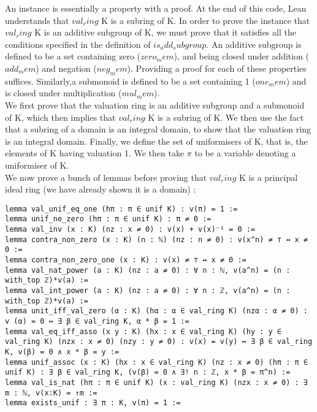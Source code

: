 \documentclass[10pt, a4paper]{article}
\begin{document}
An instance is essentially a property with a proof. At the end of this code, Lean understands that $val_ring$ K is a subring of K. In order to prove the instance that $val_ring$ K is an additive subgroup of K, we must prove that it satisfies all the conditions specified in the definition of $is_add_subgroup$. An additive subgroup is defined to be a set containing zero ($zero_mem$), and being closed under addition ($add_mem$) and negation ($neg_mem$). Providing a proof for each of these properties suffices. Similarly,a submonoid is defined to be a set containing 1 ($one_mem$) and is closed under multiplication ($mul_mem$). \\

We first prove that the valuation ring is an additive subgroup and a submonoid of K, which then implies that $val_ring$ K is a subring of K. We then use the fact that a subring of a domain is an integral domain, to show that the valuation ring is an integral domain. Finally, we define the set of uniformisers of K, that is, the elements of K having valuation 1. We then take $\pi$ to be a variable denoting a uniformiser of K. \\ 

We now prove a bunch of lemmas before proving that $val_ring$ K is a principal ideal ring (we have already shown it is a domain) :

\begin{lstlisting}
lemma val_unif_eq_one (hπ : π ∈ unif K) : v(π) = 1 :=
lemma unif_ne_zero (hπ : π ∈ unif K) : π ≠ 0 :=
lemma val_inv (x : K) (nz : x ≠ 0) : v(x) + v(x)⁻¹ = 0 :=
lemma contra_non_zero (x : K) (n : ℕ) (nz : n ≠ 0) : v(x^n) ≠ ⊤ ↔ x ≠ 0 :=
lemma contra_non_zero_one (x : K) : v(x) ≠ ⊤ ↔ x ≠ 0 :=
lemma val_nat_power (a : K) (nz : a ≠ 0) : ∀ n : ℕ, v(a^n) = (n : with_top ℤ)*v(a) :=
lemma val_int_power (a : K) (nz : a ≠ 0) : ∀ n : ℤ, v(a^n) = (n : with_top ℤ)*v(a) :=
lemma unit_iff_val_zero (α : K) (hα : α ∈ val_ring K) (nzα : α ≠ 0) : v (α) = 0 ↔ ∃ β ∈ val_ring K, α * β = 1 := 
lemma val_eq_iff_asso (x y : K) (hx : x ∈ val_ring K) (hy : y ∈ val_ring K) (nzx : x ≠ 0) (nzy : y ≠ 0) : v(x) = v(y) ↔ ∃ β ∈ val_ring K, v(β) = 0 ∧ x * β = y :=
lemma unif_assoc (x : K) (hx : x ∈ val_ring K) (nz : x ≠ 0) (hπ : π ∈ unif K) : ∃ β ∈ val_ring K, (v(β) = 0 ∧ ∃! n : ℤ, x * β = π^n) :=
lemma val_is_nat (hπ : π ∈ unif K) (x : val_ring K) (nzx : x ≠ 0) : ∃ m : ℕ, v(x:K) = ↑m :=
lemma exists_unif : ∃ π : K, v(π) = 1 :=
\end{lstlisting}
\end{document}
